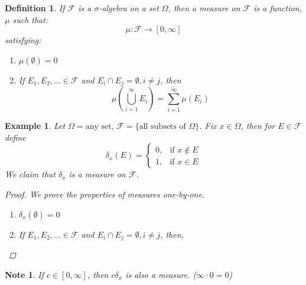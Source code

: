 \documentclass[12pt]{article}
\newtheorem{definition}{Definition}
\newtheorem{example}{Example}
\newtheorem*{note}{Note}
\begin{document}
\begin{definition} \label{D:Measure}
	If $\mathcal{F}$ is a $\sigma$-algebra on a set $\Omega$, then a \emph{measure on $\mathcal{F}$} is a function, $\mu$ such that:
	$$\mu : \mathcal{F} \rightarrow [0,\infty]$$
	satisfying:
	\begin{enumerate}
		\item $\mu(\emptyset) = 0$
		\item If $E_1,E_2,... \in \mathcal{F}$ and $E_i \cap E_j = \emptyset, i \not= j$, then
			$$\mu(\bigcup_{i=1}^\infty E_i) = \sum_{i=1}^\infty \mu(E_i)$$
	\end{enumerate}
\end{definition}

\begin{example} \label{E:Dirac}
	Let $\Omega = \text{any set},\, \mathcal{F} = \{\text{all subsets of }\Omega\}$.  Fix $x \in \Omega$, then for $E \in \mathcal{F}$ define
	$$\delta_x (E) = 
	\begin{cases}
		0, & \text{if } x \notin E\\
		1, & \text{if } x \in E
	\end{cases}$$
	We claim that $\delta_x$ is a measure on $\mathcal{F}$.
	\begin{proof}We prove the properties of measures one-by-one.
		\begin{enumerate}
			\item $\delta_x (\emptyset) = 0$
			\item If $E_1,E_2,... \in \mathcal{F}$ and $E_i \cap E_j = \emptyset, i \not= j$, then,
		\end{enumerate}
	\end{proof}
\end{example} 

\begin{note}
	If $c \in [0, \infty]$, then $c \delta_x$ is also a measure. ($\infty \cdot 0 = 0$)
\end{note}
\end{document}
